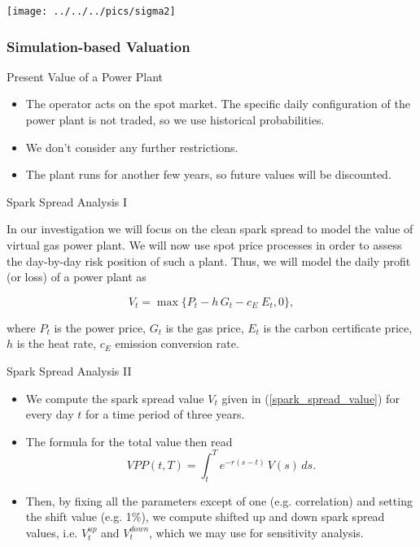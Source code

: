 \begin{center}
\texttt{[image: ../../../pics/sigma2]}
\end{center}

\subsubsection{Simulation-based Valuation}

{Present Value of a Power Plant}
\begin{itemize}
\item<1-> The operator acts on the spot market. The specific daily configuration of the power plant is not traded, so we use historical probabilities.
\item<2-> We don't consider any further restrictions.
\item<3-> The plant runs for another few years, so future values will be discounted.
\end{itemize}

{Spark Spread Analysis I}

In our investigation we will focus on the clean spark spread to model the value of virtual gas power plant. We will now use spot price processes in order to assess the day-by-day risk position of such a plant. Thus, we will model the daily profit (or loss) of a power plant as

\begin{equation}
V_t = \max\{P_t - h\,G_t - c_E\;E_t, 0\},
\label{spark_spread_value}
\end{equation}

where $P_t$ is the power price, $G_t$ is the gas price, $E_t$ is the carbon certificate price, $h$ is the heat rate, $c_E$ emission conversion rate.

{Spark Spread Analysis II}
\begin{itemize}
\item<1-> We compute the spark spread value $V_t$ given in (\ref{spark_spread_value}) for every day $t$ for a time period of three years.
\item<2->
The formula for the total value then read
$$VPP(t,T) = \int_{t}^{T}e^{-r(s-t)}\,V(s)\,ds.$$

\item<3-> Then, by fixing all the parameters except of one (e.g. correlation) and setting the shift value (e.g. 1\%), we compute shifted up and down spark spread values, i.e. $V^{up}_t$ and $V^{down}_t$, which we may use for sensitivity analysis.
\end{itemize}


